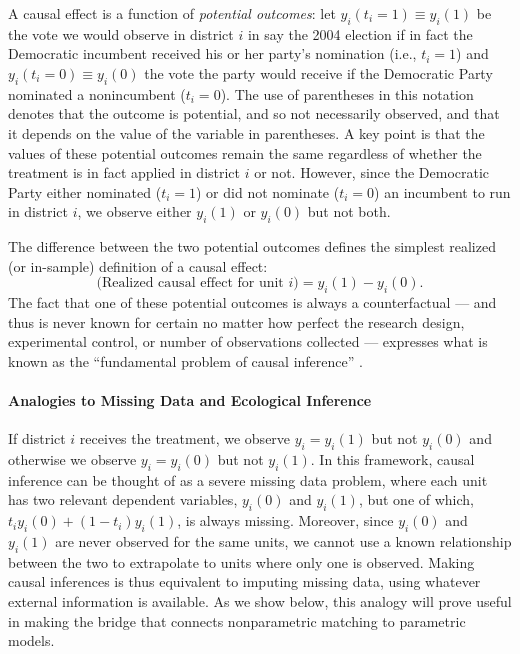 \documentclass[11pt,titlepage]{article}
\begin{document}
A causal effect is a function of \emph{potential outcomes}: let
$y_i(t_i=1)\equiv y_i(1)$ be the vote we would observe in district $i$
in say the 2004 election if in fact the Democratic incumbent received
his or her party's nomination (i.e., $t_i=1$) and $y_i(t_i=0)\equiv
y_i(0)$ the vote the party would receive if the Democratic Party
nominated a nonincumbent ($t_i=0$).  The use of parentheses in this
notation denotes that the outcome is potential, and so not necessarily
observed, and that it depends on the value of the variable in
parentheses.  A key point is that the values of these potential
outcomes remain the same regardless of whether the treatment is in
fact applied in district $i$ or not.  However, since the Democratic
Party either nominated ($t_i=1$) or did not nominate ($t_i=0$) an
incumbent to run in district $i$, we observe either $y_{i}(1)$ or
$y_{i}(0)$ but not both.

The difference between the two potential outcomes defines the simplest
realized (or in-sample) definition of a causal effect:
\begin{equation}
  \label{rce}
  \text{(Realized causal effect for unit $i$)} = y_i(1) - y_i(0).
\end{equation}
The fact that one of these potential outcomes is always a
counterfactual --- and thus is never known for certain no matter how
perfect the research design, experimental control, or number of
observations collected --- expresses what is known as the
``fundamental problem of causal inference'' \citep{Holland86}.

\paragraph{Analogies to Missing Data and Ecological Inference}
If district $i$ receives the treatment, we observe $y_i=y_i(1)$ but
not $y_i(0)$ and otherwise we observe $y_i=y_i(0)$ but not $y_i(1)$.
In this framework, causal inference can be thought of as a severe
missing data problem, where each unit has two relevant dependent
variables, $y_i(0)$ and $y_i(1)$, but one of which, $t_iy_i(0) +
(1-t_i)y_i(1)$, is always missing.  Moreover, since $y_i(0)$ and
$y_i(1)$ are never observed for the same units, we cannot use a known
relationship between the two to extrapolate to units where only one is
observed.  Making causal inferences is thus equivalent to imputing
missing data, using whatever external information is available.  As we
show below, this analogy will prove useful in making the bridge that
connects nonparametric matching to parametric models.
\end{document}

